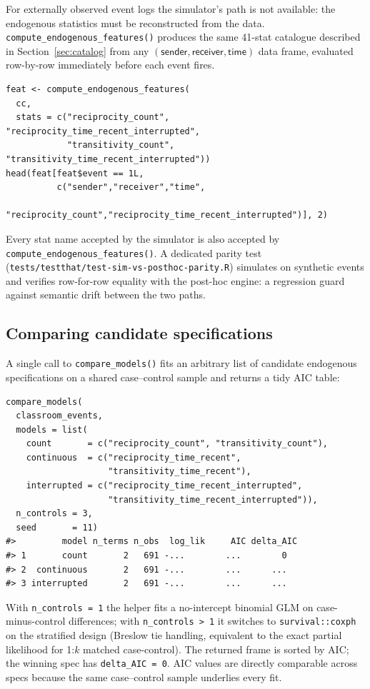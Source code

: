 \documentclass[11pt,a4paper]{article}
\begin{document}
For externally observed event logs the simulator's path is not
available: the endogenous statistics must be reconstructed from
the data. \texttt{compute\_endogenous\_features()} produces the
same 41-stat catalogue described in Section~\ref{sec:catalog} from
any $(\textsf{sender}, \textsf{receiver}, \textsf{time})$ data
frame, evaluated row-by-row immediately before each event fires.

\begin{lstlisting}
feat <- compute_endogenous_features(
  cc,
  stats = c("reciprocity_count", "reciprocity_time_recent_interrupted",
            "transitivity_count", "transitivity_time_recent_interrupted"))
head(feat[feat$event == 1L,
          c("sender","receiver","time",
            "reciprocity_count","reciprocity_time_recent_interrupted")], 2)
\end{lstlisting}

Every stat name accepted by the simulator is also accepted by
\texttt{compute\_endogenous\_features()}. A dedicated parity test
(\texttt{tests/testthat/test-sim-vs-posthoc-parity.R}) simulates
on synthetic events and verifies row-for-row equality with the
post-hoc engine: a regression guard against semantic drift between
the two paths.

\subsection{Comparing candidate specifications}\label{sec:est-compare}

A single call to \texttt{compare\_models()} fits an arbitrary list
of candidate endogenous specifications on a shared case--control
sample and returns a tidy AIC table:

\begin{lstlisting}
compare_models(
  classroom_events,
  models = list(
    count       = c("reciprocity_count", "transitivity_count"),
    continuous  = c("reciprocity_time_recent",
                    "transitivity_time_recent"),
    interrupted = c("reciprocity_time_recent_interrupted",
                    "transitivity_time_recent_interrupted")),
  n_controls = 3,
  seed       = 11)
#>         model n_terms n_obs  log_lik     AIC delta_AIC
#> 1       count       2   691 -...        ...        0
#> 2  continuous       2   691 -...        ...      ...
#> 3 interrupted       2   691 -...        ...      ...
\end{lstlisting}

With \texttt{n\_controls = 1} the helper fits a no-intercept
binomial GLM on case-minus-control differences; with
\texttt{n\_controls > 1} it switches to
\texttt{survival::coxph} on the stratified design (Breslow tie
handling, equivalent to the exact partial likelihood for 1:$k$
matched case-control). The returned frame is sorted by AIC; the
winning spec has \texttt{delta\_AIC = 0}. AIC values are
directly comparable across specs because the same case--control
sample underlies every fit.
\end{document}
